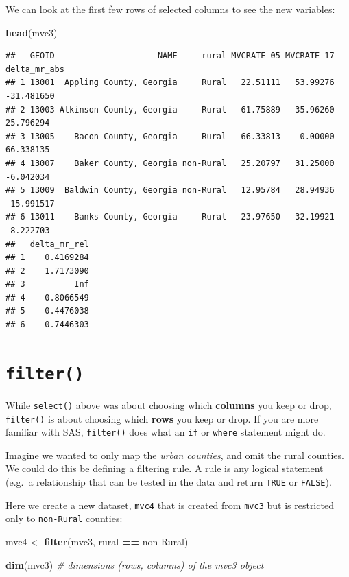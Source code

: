 \documentclass[
]{book}
\newenvironment{Shaded}{\begin{snugshade}}{\end{snugshade}}
\newcommand{\CommentTok}[1]{\textcolor[rgb]{0.56,0.35,0.01}{\textit{#1}}}
\newcommand{\FunctionTok}[1]{\textcolor[rgb]{0.13,0.29,0.53}{\textbf{#1}}}
\newcommand{\NormalTok}[1]{#1}
\newcommand{\OtherTok}[1]{\textcolor[rgb]{0.56,0.35,0.01}{#1}}
\newcommand{\SpecialCharTok}[1]{\textcolor[rgb]{0.81,0.36,0.00}{\textbf{#1}}}
\newcommand{\StringTok}[1]{\textcolor[rgb]{0.31,0.60,0.02}{#1}}
\begin{document}
We can look at the first few rows of selected columns to see the new variables:

\begin{Shaded}
\begin{Highlighting}[]
\FunctionTok{head}\NormalTok{(mvc3)}
\end{Highlighting}
\end{Shaded}

\begin{verbatim}
##   GEOID                     NAME     rural MVCRATE_05 MVCRATE_17 delta_mr_abs
## 1 13001  Appling County, Georgia     Rural   22.51111   53.99276   -31.481650
## 2 13003 Atkinson County, Georgia     Rural   61.75889   35.96260    25.796294
## 3 13005    Bacon County, Georgia     Rural   66.33813    0.00000    66.338135
## 4 13007    Baker County, Georgia non-Rural   25.20797   31.25000    -6.042034
## 5 13009  Baldwin County, Georgia non-Rural   12.95784   28.94936   -15.991517
## 6 13011    Banks County, Georgia     Rural   23.97650   32.19921    -8.222703
##   delta_mr_rel
## 1    0.4169284
## 2    1.7173090
## 3          Inf
## 4    0.8066549
## 5    0.4476038
## 6    0.7446303
\end{verbatim}

\hypertarget{filter}{%
\section{\texorpdfstring{\texttt{filter()}}{filter()}}\label{filter}}

While \texttt{select()} above was about choosing which \textbf{columns} you keep or drop, \texttt{filter()} is about choosing which \textbf{rows} you keep or drop. If you are more familiar with SAS, \texttt{filter()} does what an \texttt{if} or \texttt{where} statement might do.

Imagine we wanted to only map the \emph{urban counties}, and omit the rural counties. We could do this be defining a filtering rule. A rule is any logical statement (e.g.~a relationship that can be tested in the data and return \texttt{TRUE} or \texttt{FALSE}).

Here we create a new dataset, \texttt{mvc4} that is created from \texttt{mvc3} but is restricted only to \texttt{non-Rural} counties:

\begin{Shaded}
\begin{Highlighting}[]
\NormalTok{mvc4 }\OtherTok{\textless{}{-}} \FunctionTok{filter}\NormalTok{(mvc3, rural }\SpecialCharTok{==} \StringTok{\textquotesingle{}non{-}Rural\textquotesingle{}}\NormalTok{)}


\FunctionTok{dim}\NormalTok{(mvc3) }\CommentTok{\# dimensions (rows, columns) of the mvc3 object}
\end{Highlighting}
\end{Shaded}
\end{document}
